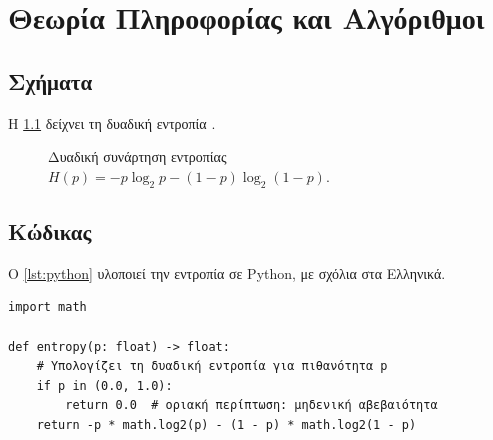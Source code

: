 \chapter{Θεωρία Πληροφορίας και Αλγόριθμοι}
\label{chap:information}

\section{Σχήματα}
\label{sec:figures}

Η \cref{fig:entropy} δείχνει τη δυαδική εντροπία \autocite{shannon1948}.

\begin{figure}[htbp]
  \centering
  \caption{Δυαδική συνάρτηση εντροπίας $H(p) = -p\log_2 p - (1-p)\log_2(1-p)$.}
  \label{fig:entropy}
\end{figure}

\section{Κώδικας}
\label{sec:code}

Ο \cref{lst:python} υλοποιεί την εντροπία σε Python, με σχόλια στα Ελληνικά.

\begin{listing}[htbp]
\begin{verbatim}
import math

def entropy(p: float) -> float:
    # Υπολογίζει τη δυαδική εντροπία για πιθανότητα p
    if p in (0.0, 1.0):
        return 0.0  # οριακή περίπτωση: μηδενική αβεβαιότητα
    return -p * math.log2(p) - (1 - p) * math.log2(1 - p)
\end{verbatim}
\caption{Συνάρτηση εντροπίας με ελληνικά σχόλια.}
\label{lst:python}
\end{listing}

\backmatter
\printbibliography


